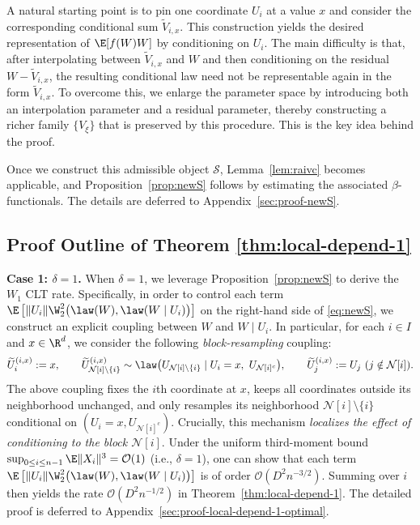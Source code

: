 \documentclass[mnsc,nonblindrev]{informs3}
\begin{document}
A natural starting point is to pin one coordinate \(U_i\) at a value \(x\) and consider the corresponding conditional sum \(\widetilde V_{i,x}\). This construction yields the desired representation of \(\E[f(W)W]\) by conditioning on \(U_i\). The main difficulty is that, after interpolating between \(\widetilde V_{i,x}\) and \(W\) and then conditioning on the residual \(W-\widetilde V_{i,x}\), the resulting conditional law need not be representable again in the form \(\widetilde V_{i,x}\). To overcome this, we enlarge the parameter space by introducing both an interpolation parameter and a residual parameter, thereby constructing a richer family \(\{V_\xi\}\) that is preserved by this procedure. This is the key idea behind the proof.

Once we construct this admissible object \(\mathcal S\), Lemma~\ref{lem:raivc} becomes applicable, and Proposition~\ref{prop:newS} follows by estimating the associated \(\beta\)-functionals. The details are deferred to Appendix~\ref{sec:proof-newS}.









\subsection{Proof Outline of Theorem \ref{thm:local-depend-1}}\label{sec:outline-local-depend-1}
\noindent\textbf{Case 1: $\delta = 1$.} When $\delta=1$, we leverage Proposition~\ref{prop:newS} to derive the $W_1$ CLT rate.  Specifically, in order to control each term $\E\left[\|U_i\|
\W_2^2\bigl(\law(W),\law(W\mid U_i)\bigr)\right]$ on the right-hand side of \eqref{eq:newS}, we construct an explicit
coupling between $W$ and $W\mid U_i$. In particular, for each $i\in I$ and $x\in\R^d$, we consider the following \emph{block-resampling} coupling:
\[
\widetilde U^{(i,x)}_i:=x,\qquad
\widetilde U^{(i,x)}_{\mathcal N[i]\setminus\{i\}}\sim \law\big(U_{\mathcal N[i]\setminus\{i\}}\mid U_i=x,\ U_{\mathcal N[i]^c}\big),
\qquad
\widetilde U^{(i,x)}_j:=U_j\ (j\notin\mathcal N[i]).
\]
The above coupling fixes the $i$th coordinate at $x$, keeps all coordinates outside its neighborhood unchanged, and only resamples its neighborhood $\mathcal N[i]\setminus\{i\}$ conditional on
$(U_i=x,U_{\mathcal N[i]^c})$.
Crucially, this mechanism \emph{localizes the effect of conditioning to the block $\mathcal N[i]$}. Under the uniform third-moment bound
$\sup_{0\le i\le n-1}\E\|X_i\|^{3}=\mathcal O(1)$ (i.e., $\delta=1$), one can show
that each term $\E\left[\|U_i\|
\W_2^2\bigl(\law(W),\law(W\mid U_i)\bigr)\right]$ is of order $\mathcal O(D^2 n^{-3/2})$. Summing over $i$ then yields the rate
$\mathcal O(D^{2} n^{-1/2})$ in Theorem~\ref{thm:local-depend-1}. The detailed
proof is deferred to Appendix~\ref{sec:proof-local-depend-1-optimal}.
\end{document}
